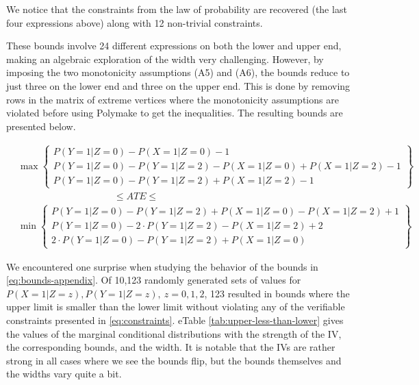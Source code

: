 \documentclass[
]{article}
\theoremstyle{plain}
\begin{document}
We notice that the constraints from the law of probability are recovered (the last four expressions above) along with 12 non-trivial constraints.

These bounds involve 24 different expressions on both the lower and upper end, making an algebraic exploration of the width very challenging. However, by imposing the two monotonicity assumptions (A5) and (A6), the bounds reduce to just three on the lower end and three on the upper end. This is done by removing rows in the matrix of extreme vertices where the monotonicity assumptions are violated before using Polymake to get the inequalities. The resulting bounds are presented below.

\[
  \begin{aligned}
    &\max
      \begin{Bmatrix}
        P(Y = 1 | Z = 0) - P(X = 1 | Z = 0) - 1 \\
        P(Y = 1 | Z = 0) - P(Y = 1 | Z = 2) - P(X = 1 | Z = 0) + P(X = 1 | Z = 2) - 1 \\
        P(Y = 1 | Z = 0) - P(Y = 1 | Z = 2) + P(X = 1 | Z = 2) - 1
      \end{Bmatrix} \\
    &\qquad \qquad \qquad \qquad \qquad\le ATE \le \\
    &\min
      \begin{Bmatrix}
        P(Y = 1 | Z = 0) - P(Y = 1 | Z = 2) + P(X = 1 | Z = 0) - P(X = 1 | Z = 2) + 1\\
        P(Y = 1 | Z = 0) - 2\cdot P(Y = 1 | Z = 2) - P(X = 1 | Z = 2) + 2 \\
        2\cdot P(Y = 1 | Z = 0) - P(Y = 1 | Z = 2) + P(X = 1 | Z = 0)
      \end{Bmatrix}
  \end{aligned}
\]

We encountered one surprise when studying the behavior of the bounds in \eqref{eq:bounds-appendix}. Of 10,123 randomly generated sets of values for \(P(X = 1 | Z = z), P(Y = 1 | Z = z),\ z = 0,1,2\), 123 resulted in bounds where the upper limit is smaller than the lower limit without violating any of the verifiable constraints presented in \eqref{eq:constraints}. eTable \ref{tab:upper-less-than-lower} gives the values of the marginal conditional distributions with the strength of the IV, the corresponding bounds, and the width. It is notable that the IVs are rather strong in all cases where we see the bounds flip, but the bounds themselves and the widths vary quite a bit.
\end{document}
